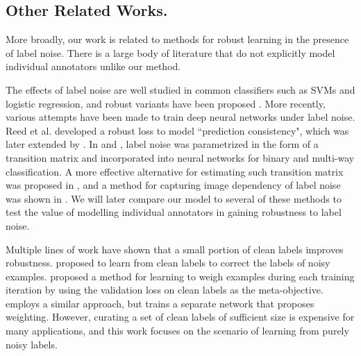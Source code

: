 \subsection{Other Related Works.}
More broadly, our work is related to methods for robust learning in the presence of label noise. There is a large body of literature that do not explicitly model individual annotators unlike our method. 

The effects of label noise are well studied in common classifiers such as SVMs and logistic regression, and robust variants have been proposed \cite{frenay2014classification,natarajan2013learning,bootkrajang2012label}.  More recently, various attempts have been made to train deep neural networks under label noise.  Reed et al. \cite{reed2014training} developed a robust loss to model ``prediction consistency", which was later extended by \cite{tanaka2018joint}. %
In \cite{mnih2012learning} and \cite{sukhbaatar2014training}, label noise was parametrized in the form of a transition matrix and incorporated into neural networks for binary and multi-way classification. A more effective alternative for estimating such transition matrix was proposed in \cite{patrini2017making}, and a method for capturing image dependency of label noise was shown in \cite{Goldberger2017TrainingDN}. We will later compare our model to several of these methods to test the value of modelling individual annotators in gaining robustness to label noise. 

Multiple lines of work have shown that a small portion of clean labels improves robustness. \cite{veit2017learning} proposed to learn from clean labels to correct the labels of noisy examples. \cite{ren2018learning} proposed a method for learning to weigh examples during each training iteration by using the validation loss on clean labels as the meta-objective. \cite{jiang2018mentornet} employs a similar approach, but trains a separate network that proposes weighting. However, curating a set of clean labels of sufficient size is expensive for many applications, and this work focuses on the scenario of learning from purely noisy labels. 

